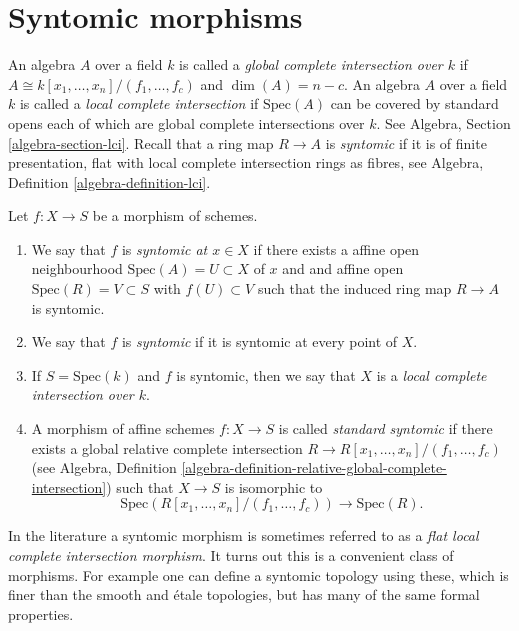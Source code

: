 \section{Syntomic morphisms}
\label{section-syntomic}

\noindent
An algebra $A$ over a field $k$ is called a
{\it global complete intersection over $k$}
if $A \cong k[x_1, \ldots, x_n]/(f_1, \ldots, f_c)$ and
$\dim(A) = n - c$. An algebra $A$ over a field $k$ is called a
{\it local complete intersection} if $\text{Spec}(A)$
can be covered by standard opens each of which are global
complete intersections over $k$. See Algebra, Section
\ref{algebra-section-lci}. Recall that a ring map $R \to A$
is {\it syntomic} if it is of finite presentation,
flat with local complete intersection rings as fibres,
see Algebra, Definition \ref{algebra-definition-lci}.

\begin{definition}
\label{definition-syntomic}
Let $f : X \to S$ be a morphism of schemes.
\begin{enumerate}
\item We say that $f$ is {\it syntomic at $x \in X$} if
there exists a affine open neighbourhood $\text{Spec}(A) = U \subset X$
of $x$ and and affine open $\text{Spec}(R) = V \subset S$
with $f(U) \subset V$ such that the induced ring map
$R \to A$ is syntomic.
\item We say that $f$ is {\it syntomic} if it is syntomic
at every point of $X$.
\item If $S = \text{Spec}(k)$ and $f$ is syntomic, then we say that
$X$ is a {\it local complete intersection over $k$}.
\item A morphism of affine schemes $f : X \to S$
is called {\it standard syntomic} if there exists a
global relative complete intersection
$R \to R[x_1, \ldots, x_n]/(f_1, \ldots, f_c)$ (see
Algebra,
Definition \ref{algebra-definition-relative-global-complete-intersection})
such that $X \to S$ is isomorphic to
$$
\text{Spec}(R[x_1, \ldots, x_n]/(f_1, \ldots, f_c)) \to \text{Spec}(R).
$$
\end{enumerate}
\end{definition}

\noindent
In the literature a syntomic morphism is sometimes referred to as a
{\it flat local complete intersection morphism}.
It turns out this is a convenient class of morphisms. For example one
can define a syntomic topology using these, which is finer than the
smooth and \'etale topologies, but has many of the same formal properties.

